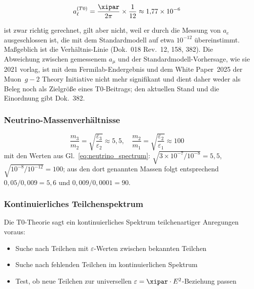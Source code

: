 	\begin{equation}
		a_\ell^{(T0)} = \frac{\xipar}{2\pi} \times \frac{1}{12} \approx 1{,}77 \times 10^{-6}
		\label{eq:universal_lepton_correction}
	\end{equation}
	
	ist zwar richtig gerechnet, gilt aber nicht, weil er durch die Messung von $a_e$ ausgeschlossen ist, die mit dem Standardmodell auf etwa $10^{-12}$ übereinstimmt. Maßgeblich ist die Verhältnis-Linie (Dok.~018 Rev.~12, 158, 382). Die Abweichung zwischen gemessenem $a_\mu$ und der Standardmodell-Vorhersage, wie sie 2021 vorlag, ist mit dem Fermilab-Endergebnis und dem White Paper~2025 der Muon~$g-2$ Theory Initiative nicht mehr signifikant und dient daher weder als Beleg noch als Zielgröße eines T0-Beitrags; den aktuellen Stand und die Einordnung gibt Dok.~382.
	
	\subsubsection{Neutrino-Massenverhältnisse}
	
	\begin{equation}
		\frac{m_3}{m_2} = \sqrt{\frac{\varepsilon_3}{\varepsilon_2}} \approx 5{,}5, \quad \frac{m_2}{m_1} = \sqrt{\frac{\varepsilon_2}{\varepsilon_1}} \approx 100
		\label{eq:neutrino_mass_ratios}
	\end{equation}
	mit den Werten aus Gl.~\eqref{eq:neutrino_spectrum}: $\sqrt{3\times10^{-7}/10^{-8}} = 5{,}5$, $\sqrt{10^{-8}/10^{-12}} = 100$; aus den dort genannten Massen folgt entsprechend $0{,}05/0{,}009 = 5{,}6$ und $0{,}009/0{,}0001 = 90$.
	
	\subsubsection{Kontinuierliches Teilchenspektrum}
	
	Die T0-Theorie sagt ein kontinuierliches Spektrum teilchenartiger Anregungen voraus:
	
	\begin{itemize}
		\item Suche nach Teilchen mit $\varepsilon$-Werten zwischen bekannten Teilchen
		\item Suche nach fehlenden Teilchen im kontinuierlichen Spektrum
		\item Test, ob neue Teilchen zur universellen $\varepsilon = \xipar \cdot E^2$-Beziehung passen
	\end{itemize}
	
